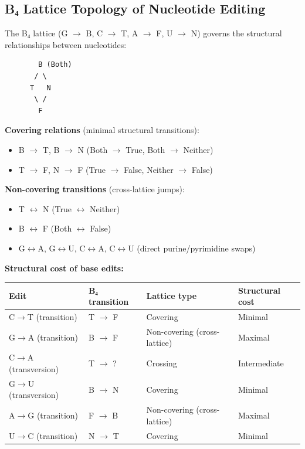 \documentclass[12pt,a4paper]{article}
\begin{document}
\subsection{B₄ Lattice Topology of Nucleotide Editing}

The B₄ lattice (G $\rightarrow$ B, C $\rightarrow$ T, A $\rightarrow$ F, U $\rightarrow$ N) governs the structural relationships between nucleotides:

\begin{lstlisting}
        B (Both)
       / \
      T   N
       \ /
        F
\end{lstlisting}

\textbf{Covering relations} (minimal structural transitions):

\begin{itemize}
    \item B $\rightarrow$ T, B $\rightarrow$ N (Both $\rightarrow$ True, Both $\rightarrow$ Neither)
    \item T $\rightarrow$ F, N $\rightarrow$ F (True $\rightarrow$ False, Neither $\rightarrow$ False)
\end{itemize}

\textbf{Non-covering transitions} (cross-lattice jumps):

\begin{itemize}
    \item T $\leftrightarrow$ N (True $\leftrightarrow$ Neither)
    \item B $\leftrightarrow$ F (Both $\leftrightarrow$ False)
    \item G$\leftrightarrow$A, G$\leftrightarrow$U, C$\leftrightarrow$A, C$\leftrightarrow$U (direct purine/pyrimidine swaps)
\end{itemize}

\textbf{Structural cost of base edits:}

\begin{table}[htbp]
\centering
\small
{}
\begin{tabularx}{\textwidth}{>{\centering\arraybackslash}X >{\centering\arraybackslash}X >{\centering\arraybackslash}X >{\centering\arraybackslash}X}
\toprule
\rowcolor{gray!25}\textbf{Edit} & \textbf{B₄ transition} & \textbf{Lattice type} & \textbf{Structural cost} \\
\midrule
\rowcolors{1}{white}{gray!10}
C$\rightarrow$T (transition) & T $\rightarrow$ F & Covering & Minimal \\
G$\rightarrow$A (transition) & B $\rightarrow$ F & Non-covering (cross-lattice) & Maximal \\
C$\rightarrow$A (transversion) & T $\rightarrow$ ? & Crossing & Intermediate \\
G$\rightarrow$U (transversion) & B $\rightarrow$ N & Covering & Minimal \\
A$\rightarrow$G (transition) & F $\rightarrow$ B & Non-covering (cross-lattice) & Maximal \\
U$\rightarrow$C (transition) & N $\rightarrow$ T & Covering & Minimal \\
\bottomrule
\end{tabularx}
\end{table}
\end{document}
